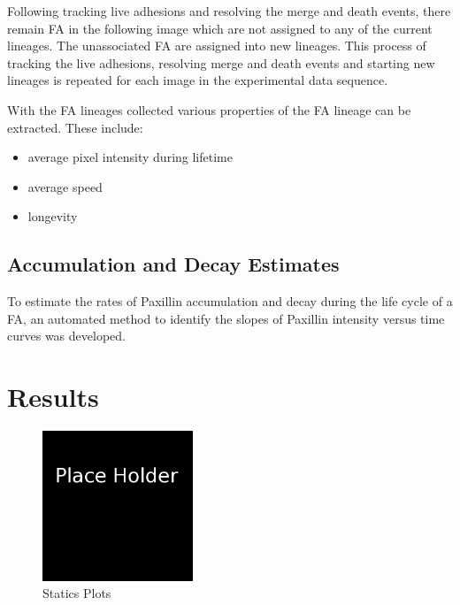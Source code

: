 \documentclass[letterpaper,twocolumn]{article}
\begin{document}
Following tracking live adhesions and resolving the merge and death events, there remain FA in the following image which are not assigned to any of the current lineages. The unassociated FA are assigned into new lineages. This process of tracking the live adhesions, resolving merge and death events and starting new lineages is repeated for each image in the experimental data sequence.

With the FA lineages collected various properties of the FA lineage can be extracted. These include:

\begin{itemize}
\item average pixel intensity during lifetime
\item average speed
\item longevity
\end{itemize}

\subsection*{Accumulation and Decay Estimates}

To estimate the rates of Paxillin accumulation and decay during the life cycle of a FA, an automated method to identify the slopes of Paxillin intensity versus time curves was developed. 

\section*{Results}

\begin{figure}[htbp]
\begin{center}
\includegraphics[width=0.4\textwidth]{figures/place_holder}
\caption{Statics Plots}
\label{statics_figure}
\end{center}
\end{figure}
\end{document}
